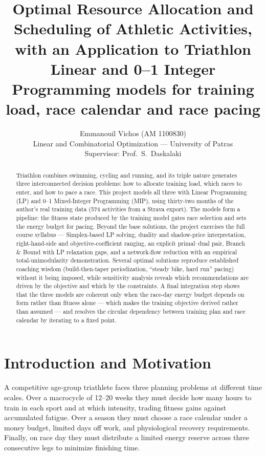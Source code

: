 \documentclass[11pt,a4paper]{article}
\title{Optimal Resource Allocation and Scheduling of Athletic Activities,\\
       with an Application to Triathlon\\[6pt]
       \large Linear and 0--1 Integer Programming models for training load,
       race calendar and race pacing}
\author{Emmanouil Vichos (AM 1100830)\\[2pt]
        \small Linear and Combinatorial Optimization --- University of Patras\\
        \small Supervisor: Prof.\ S.\ Daskalaki}
\date{}   %
\begin{document}
\maketitle

\begin{abstract}
Triathlon combines swimming, cycling and running, and its triple nature generates
three interconnected decision problems: how to allocate training load, which races
to enter, and how to pace a race. This project models all three with Linear
Programming (LP) and 0--1 Mixed-Integer Programming (MIP), using thirty-two months of
the author's real training data (574 activities from a Strava export). The models
form a pipeline: the fitness state produced by the training model gates race
selection and sets the energy budget for pacing. Beyond the base solutions, the
project exercises the full course syllabus --- Simplex-based LP solving, duality and
shadow-price interpretation, right-hand-side and objective-coefficient ranging,
an explicit primal--dual pair, Branch \& Bound with LP
relaxation gaps, and a network-flow reduction with an empirical total-unimodularity
demonstration. Several optimal solutions reproduce established coaching wisdom
(build-then-taper periodization, ``steady bike, hard run'' pacing) without it being
imposed, while sensitivity analysis reveals which recommendations are driven by the
objective and which by the constraints. A final integration step shows that the
three models are coherent only when the race-day energy budget depends on form
rather than fitness alone --- which makes the training objective derived rather
than assumed --- and resolves the circular dependency between training plan and
race calendar by iterating to a fixed point.
\end{abstract}

\section{Introduction and Motivation}

A competitive age-group triathlete faces three planning problems at different time
scales. Over a macrocycle of 12--20 weeks they must decide how many hours to train
in each sport and at which intensity, trading fitness gains against accumulated
fatigue. Over a season they must choose a race calendar under a money budget,
limited days off work, and physiological recovery requirements. Finally, on race
day they must distribute a limited energy reserve across three consecutive legs to
minimize finishing time.
\end{document}

